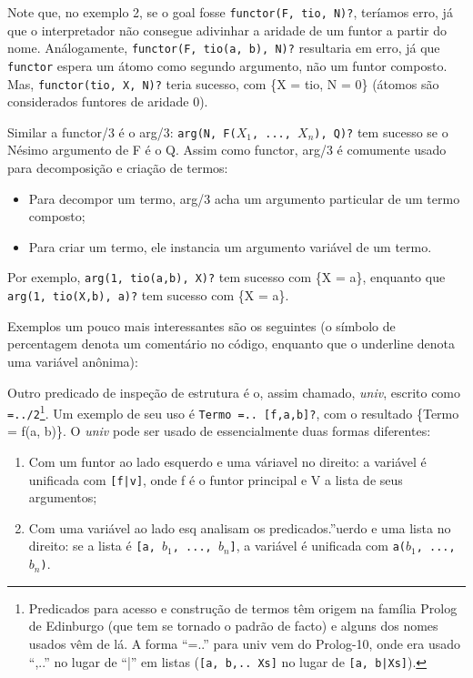 \documentclass{article}
\theoremstyle{remark}
\theoremstyle{theorem}
\begin{document}
Note que, no exemplo 2, se o goal fosse {\tt functor(F, tio, N)?}, teríamos erro, já que o interpretador não consegue adivinhar a aridade de um funtor a partir do nome. Análogamente, {\tt functor(F, tio(a, b), N)?} resultaria em erro, já que {\tt functor} espera um átomo como segundo argumento, não um funtor composto. Mas, {\tt functor(tio, X, N)?} teria sucesso, com \{X = tio, N = 0\} (átomos são considerados funtores de aridade 0).

Similar a functor/3 é o arg/3: {\tt arg(N, F($X_1$, ..., $X_n$), Q)?} tem sucesso se o Nésimo argumento de F é o Q. Assim como functor, arg/3 é comumente usado para decomposição e criação de termos:
\begin{itemize}
  \item Para decompor um termo, arg/3 acha um argumento particular de um termo composto;
  \item Para criar um termo, ele instancia um argumento variável de um termo.
\end{itemize}

Por exemplo, {\tt arg(1, tio(a,b), X)?} tem sucesso com \{X = a\}, enquanto que {\tt arg(1, tio(X,b), a)?} tem sucesso com \{X = a\}.

Exemplos um pouco mais interessantes são os seguintes (o símbolo de percentagem denota um comentário no código, enquanto que o underline denota uma variável anônima):





Outro predicado de inspeção de estrutura é o, assim chamado, \textit{univ}, escrito como {\tt =../2}\footnote{Predicados para acesso e construção de termos têm origem na família Prolog de Edinburgo (que tem se tornado o padrão de facto) e alguns dos nomes usados vêm de lá. A forma “=..” para univ vem do Prolog-10, onde era usado “,..” no lugar de “|” em listas ({\tt[a, b,.. Xs]} no lugar de {\tt [a, b|Xs]}).}. Um exemplo de seu uso é {\tt Termo =.. [f,a,b]?}, com o resultado \{Termo = f(a, b)\}.
O \textit{univ} pode ser usado de essencialmente duas formas diferentes:
\begin{enumerate}
  \item Com um funtor ao lado esquerdo e uma váriavel no direito: a variável é unificada com {\tt [f|v]}, onde f é o funtor principal e V a lista de seus argumentos;
  \item Com uma variável ao lado esq analisam os predicados.''uerdo e uma lista no direito: se a lista é {\tt [a, $b_1$, ..., $b_n$]}, a variável é unificada com {\tt a($b_1$, ..., $b_n$)}.
\end{enumerate}
\end{document}
